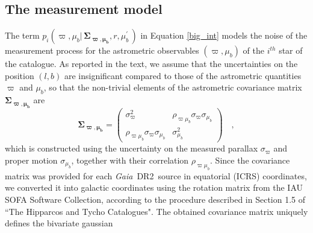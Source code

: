 \documentclass{nature}
\newcommand{\gdrtwo}{\textit{Gaia}~DR2}
\begin{document}
\begin{methods}
\subsection{The measurement model \label{noise}}
The term  $  p_i(\varpi, \mu_{b}  |\, \boldsymbol{   \Sigma_{\varpi,\mu_b}},  r, \mu^\prime_{b} \,) $ in Equation \ref{big_int} models the noise of the measurement process for the astrometric observables $(\varpi, \mu_{b})$ of the $i^{th}$ star of the catalogue. As reported in the text, we assume that the uncertainties on the position $(l,b)$ are insignificant compared to those of the astrometric quantities $\varpi$ and $\mu_b$, so that the non-trivial elements of the astrometric covariance matrix $\boldsymbol{\Sigma_{\varpi,\mu_b} }$ are 
\begin{equation}
\label{coV_matrix}
\boldsymbol{\Sigma_{\varpi,\mu_b} } =
\begin{pmatrix}
  \sigma^2_{\varpi}      & \rho_{\varpi \mu_{b}} \sigma_{\varpi}  \sigma_{\mu_{b}}  \\
  \rho_{\varpi \mu_{b}} \sigma_{\varpi}  \sigma_{\mu_{b}}                 & \sigma^2_{\mu_{b}}  
\end{pmatrix} \quad,
\end{equation}
which is constructed using the uncertainty on the measured parallax $\sigma_{\varpi}$ and proper motion $\sigma_{\mu_{b}}$, together with their correlation $\rho_{\varpi \mu_{b}}$. Since the covariance matrix was provided for each \gdrtwo\, source in equatorial (ICRS) coordinates, we converted it into galactic coordinates using the rotation matrix from the IAU SOFA Software Collection\cite{SOFA:2018-01-30}, according to the procedure described in Section 1.5 of ``The Hipparcos and Tycho Catalogues"\cite{ESA:Hipparcos}. The obtained covariance matrix uniquely defines the bivariate gaussian

\end{methods}
\end{document}
